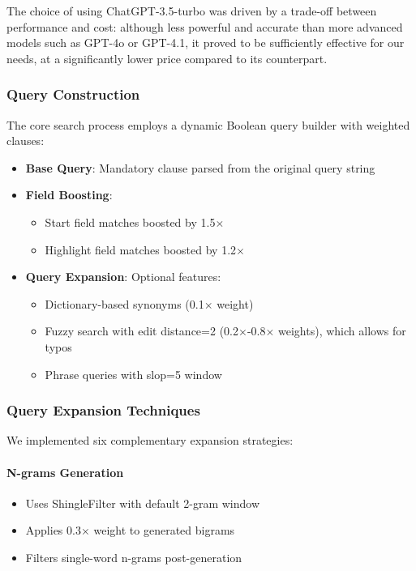 The choice of using ChatGPT-3.5-turbo was driven by a trade-off between performance and cost: although less powerful and accurate than more advanced models such as GPT-4o or GPT-4.1, it proved to be sufficiently effective for our needs, at a significantly lower price compared to its counterpart.



\subsubsection{Query Construction}
\label{subsubsec:Query Construction}
The core search process employs a dynamic Boolean query builder with weighted clauses:

\begin{itemize}
    \item \textbf{Base Query}: Mandatory clause parsed from the original query string
    \item \textbf{Field Boosting}:
    \begin{itemize}
        \item Start field matches boosted by 1.5$\times$
        \item Highlight field matches boosted by 1.2$\times$
    \end{itemize}
    \item \textbf{Query Expansion}: Optional features:
    \begin{itemize}
        \item Dictionary-based synonyms (0.1$\times$ weight)
        \item Fuzzy search with edit distance=2 (0.2$\times$-0.8$\times$ weights), which allows for typos
        \item Phrase queries with slop=5 window
    \end{itemize}
\end{itemize}

\subsubsection{Query Expansion Techniques}
\label{subsubsec:Query Expansion Techniques}
We implemented six complementary expansion strategies:

\paragraph{N-grams Generation}
\begin{itemize}
    \item Uses ShingleFilter with default 2-gram window
    \item Applies 0.3$\times$ weight to generated bigrams
    \item Filters single-word n-grams post-generation
\end{itemize}

